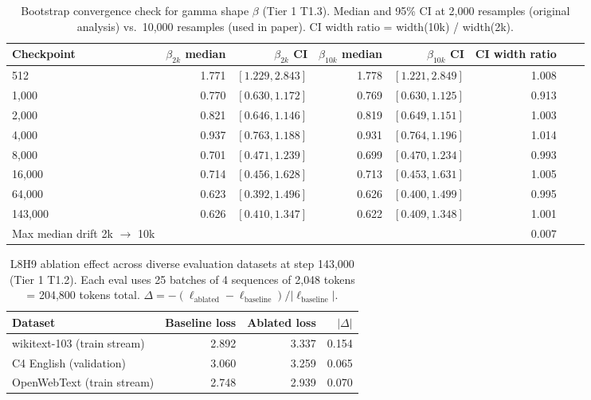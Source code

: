 \documentclass{article}
\begin{document}
\begin{table}[h]
\centering
\caption{Bootstrap convergence check for gamma shape $\beta$ (Tier 1 T1.3). Median and 95\% CI at 2{,}000 resamples (original analysis) vs.\ 10{,}000 resamples (used in paper). CI width ratio = width(10k) / width(2k).}
\label{tab:tier1_bootstrap}
\small
\begin{tabular}{lrrrrrrr}
\toprule
Checkpoint & $\beta_{2k}$ median & $\beta_{2k}$ CI & $\beta_{10k}$ median & $\beta_{10k}$ CI & CI width ratio \\
\midrule
512       & 1.771 & $[1.229, 2.843]$ & 1.778 & $[1.221, 2.849]$ & 1.008 \\
1{,}000   & 0.770 & $[0.630, 1.172]$ & 0.769 & $[0.630, 1.125]$ & 0.913 \\
2{,}000   & 0.821 & $[0.646, 1.146]$ & 0.819 & $[0.649, 1.151]$ & 1.003 \\
4{,}000   & 0.937 & $[0.763, 1.188]$ & 0.931 & $[0.764, 1.196]$ & 1.014 \\
8{,}000   & 0.701 & $[0.471, 1.239]$ & 0.699 & $[0.470, 1.234]$ & 0.993 \\
16{,}000  & 0.714 & $[0.456, 1.628]$ & 0.713 & $[0.453, 1.631]$ & 1.005 \\
64{,}000  & 0.623 & $[0.392, 1.496]$ & 0.626 & $[0.400, 1.499]$ & 0.995 \\
143{,}000 & 0.626 & $[0.410, 1.347]$ & 0.622 & $[0.409, 1.348]$ & 1.001 \\
\midrule
Max median drift 2k $\to$ 10k & & & & & $0.007$ \\
\bottomrule
\end{tabular}
\end{table}

\begin{table}[h]
\centering
\caption{L8H9 ablation effect across diverse evaluation datasets at step 143{,}000 (Tier 1 T1.2). Each eval uses 25 batches of 4 sequences of 2{,}048 tokens = 204{,}800 tokens total. $\Delta = -(\ell_\text{ablated} - \ell_\text{baseline}) / |\ell_\text{baseline}|$.}
\label{tab:tier1_l8h9_datasets}
\begin{tabular}{lrrr}
\toprule
Dataset & Baseline loss & Ablated loss & $|\Delta|$ \\
\midrule
wikitext-103 (train stream) & 2.892 & 3.337 & 0.154 \\
C4 English (validation) & 3.060 & 3.259 & 0.065 \\
OpenWebText (train stream) & 2.748 & 2.939 & 0.070 \\
\bottomrule
\end{tabular}
\end{table}
\end{document}

